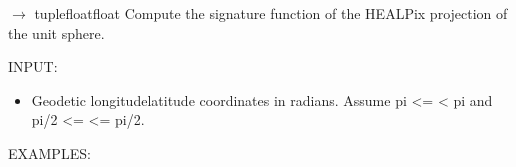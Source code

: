 \documentclass[a4paper,12ptopenany,oneside,english]{sphinxmanual}
\begin{document}
\begin{fulllineitems}
\label{\detokenize{pj_healpix:rhealpixdggs.pj_healpix.healpix_sphere}}
\pysigstartsignatures
\pysiglinewithargsret
{}
{\sphinxparamcomma {}}
{{ $\rightarrow$ tuple\DUrole{p}{{[}}floatfloat\DUrole{p}{{]}}}}
\pysigstopsignatures
\sphinxAtStartPar
Compute the signature function of the HEALPix
projection of the unit sphere.

\sphinxAtStartPar
INPUT:
\begin{itemize}
\item {} 
\sphinxAtStartPar
{} \sphinxhyphen{} Geodetic longitude\sphinxhyphen{}latitude coordinates in radians.
Assume \sphinxhyphen{}pi \textless{}=  \textless{} pi and \sphinxhyphen{}pi/2 \textless{}=  \textless{}= pi/2.

\end{itemize}

\sphinxAtStartPar
EXAMPLES:

\begin{sphinxVerbatim}[commandchars=\\\{\}]
    
\end{sphinxVerbatim}

\end{fulllineitems}

\end{document}
